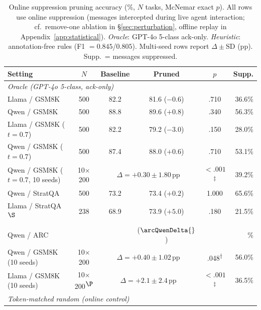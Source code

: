 \begin{table}[t]
\centering
\caption{Online suppression pruning accuracy (\%, $N$ tasks, McNemar exact $p$). All rows use online suppression (messages intercepted during live agent interaction; cf.\ remove-one ablation in \S\ref{sec:perturbation}, offline replay in Appendix~\ref{app:statistical}). \emph{Oracle}: GPT-4o 5-class ack-only. \emph{Heuristic}: annotation-free rules (F1 $= 0.845$/$0.805$). Multi-seed rows report $\Delta \pm \text{SD}$ (pp). Supp.\ = messages suppressed.\protect\footnotemark}
\label{tab:online_pruning}
\small
\begin{tabular}{lccccr}
\toprule
\textbf{Setting} & $N$ & \textbf{Baseline} & \textbf{Pruned} & $p$ & \textbf{Supp.} \\
\midrule
\multicolumn{6}{l}{\textit{Oracle (GPT-4o 5-class, ack-only)}} \\
\rowcolor{blue!4}
Llama / GSM8K & 500 & 82.2 & 81.6 ($-0.6$) & .710 & 36.6\% \\
\rowcolor{blue!4}
Qwen / GSM8K & 500 & 88.8 & 89.6 ($+0.8$) & .340 & 56.3\% \\
\rowcolor{blue!4}
Llama / GSM8K ($t{=}0.7$) & 500 & 82.2 & 79.2 ($-3.0$) & .150 & 28.0\% \\
\rowcolor{blue!4}
Qwen / GSM8K ($t{=}0.7$) & 500 & 87.4 & 88.0 ($+0.6$) & .710 & 53.1\% \\
\rowcolor{blue!4}
Qwen / GSM8K ($t{=}0.7$, 10 seeds) & 10${\times}$200 & \multicolumn{2}{c}{$\Delta = +0.30 \pm 1.80$\,pp} & ${<}.001$\textsuperscript{$\ddagger$} & 39.2\% \\
\rowcolor{blue!4}
Qwen / StratQA & 500 & 73.2 & 73.4 ($+0.2$) & 1.000 & 65.6\% \\
\rowcolor{blue!4}
Llama / StratQA\textsuperscript{$\S$} & 238 & 68.9 & 73.9 ($+5.0$) & .180 & 21.5\% \\
\rowcolor{blue!4}
Qwen / ARC & \arcN{} & \arcQwenBaseline{} & \arcQwenPruned{} ($\arcQwenDelta{}$) & \arcQwenPvalue{} & \arcQwenSupp{}\% \\
\rowcolor{blue!4}
Qwen / GSM8K (10 seeds) & 10${\times}$200 & \multicolumn{2}{c}{$\Delta = +0.40 \pm 1.02$\,pp} & .048\textsuperscript{$\dagger$} & 56.0\% \\
\rowcolor{blue!4}
Llama / GSM8K (10 seeds) & 10${\times}$200\textsuperscript{$\P$} & \multicolumn{2}{c}{$\Delta = +2.1 \pm 2.4$\,pp} & ${<}.001$\textsuperscript{$\ddagger$} & 36.5\% \\
\midrule
\multicolumn{6}{l}{\textit{Token-matched random (online control)}} \\

\end{tabular}
\end{table}
